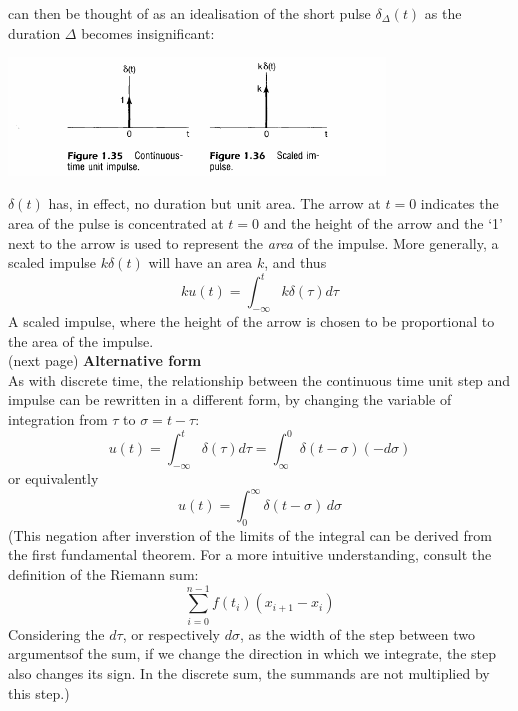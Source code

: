 \documentclass{report}
\begin{document}
can then be thought of as an idealisation of the short pulse $\delta_\Delta(t)$ as the duration $\Delta$ becomes insignificant:
\begin{center}
\includegraphics[width=10cm]{a11}
\end{center}
$\delta(t)$ has, in effect, no duration but unit area. The arrow at $t=0$ indicates the area of the pulse is concentrated
at $t=0$ and the height of the arrow and the `1' next to the arrow is used to represent the \textit{area} of the impulse. More generally, 
a scaled impulse $k\delta(t)$ will have an area $k$, and thus
\begin{equation*}
ku(t)=\int^t_{-\infty}k\delta(\tau)d\tau
\end{equation*}
A scaled impulse, where the height of the arrow is chosen to be proportional to the area of the impulse.\\
(next page)\newpage
\noindent\textbf{Alternative form}\\
As with discrete time, the relationship between the continuous time unit step and impulse can be rewritten in a different form, 
by changing the variable of integration from $\tau$ to $\sigma=t-\tau$:
\begin{equation*}
u(t)=\int_{-\infty}^t\delta(\tau)d\tau=\int^0_\infty\delta(t-\sigma)(-d\sigma)
\end{equation*}
or equivalently
\begin{equation*}
u(t)=\int_0^\infty\delta(t-\sigma)\,d\sigma
\end{equation*}
(This negation after inverstion of the limits of the integral can be derived from the first fundamental theorem. For a 
more intuitive understanding, consult the definition of the Riemann sum:
\begin{equation*}
\sum^{n-1}_{i=0}f(t_i)(x_{i+1}-x_{i})
\end{equation*}
Considering the $d\tau$, or respectively $d\sigma$, as the width of the step between two argumentsof the sum, if we change the
direction in which we integrate, the step also changes its sign.
In the discrete sum, the summands are not multiplied by this step.)\\
\vspace{1mm}\\
\end{document}
